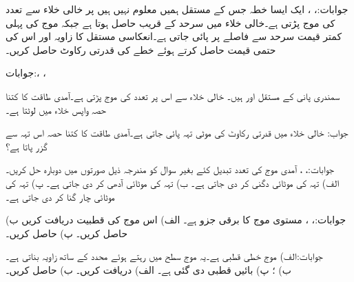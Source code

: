 جوابات:، ، 
ایک ایسا خطہ جس کے مستقل ہمیں معلوم نہیں ہیں پر خالی خلاء سے  تعدد کی موج پڑتی ہے۔خالی خلاء میں سرحد کے قریب  حاصل ہوتا ہے جبکہ موج کی پہلی کمتر قیمت سرحد سے  فاصلے پر پائی جاتی ہے۔انعکاسی مستقل کا زاویہ  اور اس کی حتمی قیمت  حاصل کرتے ہوئے خطے کی قدرتی رکاوٹ حاصل کریں۔

جوابات:، ،    

سمندری پانی کے مستقل  اور  ہیں۔ خالی خلاء سے اس پر  تعدد کی موج پڑتی ہے۔آمدی طاقت کا کتنا حصہ واپس خلاء میں لوٹتا ہے۔

جواب: 
خالی خلاء میں  قدرتی رکاوٹ کی  موٹی تہہ پائی جاتی ہے۔آمدی طاقت کا کتنا حصہ اس تہہ سے گزر پاتا ہے؟ 

جوابات:، ،  
آمدی موج کی تعدد تبدیل کئے بغیر سوال  کو مندرجہ ذیل صورتوں میں دوبارہ حل کریں۔ الف) تہہ کی موٹائی دگنی کر دی جاتی ہے۔ ب) تہہ کی موٹائی آدھی کر دی جاتی ہے۔ پ) تہہ کی موٹائی  چار گنا کر دی جاتی ہے۔

جوابات:، ، 
مستوی موج کا برقی جزو  ہے۔ الف) اس موج کی قطبیت دریافت کریں ب)  حاصل کریں۔ پ)  حاصل کریں۔

جوابات:الف) موج خطی قطبی ہے۔یہ موج  سطح میں رہتے ہوئے  محدد کے ساتھ  زاویہ بناتی ہے۔\\
 ب) ؛ پ) 
بائیں قطبی  دی گئی ہے۔ الف)  دریافت کریں۔ ب)  حاصل کریں۔

